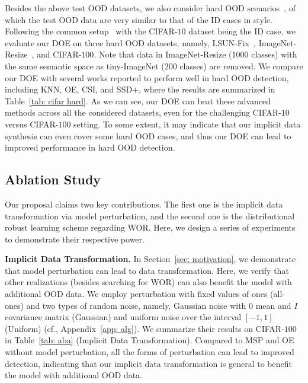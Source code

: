 \documentclass{article} \usepackage{iclr2022_conference,times}
\begin{document}
Besides the above test OOD datasets, we also consider hard OOD scenarios~\citep{Tack20CSI}, of which the test OOD data are very similar to that of the ID cases in style. Following the common setup~\citep{SunM0L22} with the CIFAR-$10$ dataset being the ID case, we evaluate our DOE on three hard OOD datasets, namely, LSUN-Fix~\citep{yu2015lsun}, ImageNet-Resize~\citep{deng2009imagenet}, and CIFAR-$100$. Note that data in ImageNet-Resize ($1000$ classes) with the same semantic space as tiny-ImageNet ($200$ classes) are removed. We compare our DOE with several works reported to perform well in hard OOD detection, including KNN, OE, CSI, and SSD+, where the results are summarized in Table~\ref{tab: cifar hard}. As we can see, our DOE can beat these advanced methods across all the considered datasets, even for the challenging CIFAR-$10$ versus CIFAR-$100$ setting. To some extent, it may indicate that our implicit data synthesis can even cover some hard OOD cases, and thus our DOE can lead to improved performance in hard OOD detection. 




\subsection{Ablation Study} \label{sec: ablation}




Our proposal claims two key contributions. The first one is the implicit data transformation via model perturbation, and the second one is the distributional robust learning scheme regarding WOR. Here, we design a series of experiments to demonstrate their respective power. 

\textbf{Implicit Data Transformation.} 
In Section~\ref{sec: motivation}, we demonstrate that model perturbation can lead to data transformation. Here, we verify that other realizations (besides searching for WOR) can also benefit the model with additional OOD data. We employ perturbation with fixed values of ones (all-ones) and two types of random noise, namely, Gaussian noise with $0$ mean and $I$ covariance matrix (Gaussian) and uniform noise over the interval $[-1,1]$ (Uniform) {(cf., Appendix~\ref{app: alg})}. We summarize their results on CIFAR-$100$ in Table~\ref{tab: aba} (Implicit Data Transformation). Compared to MSP and OE without model perturbation, all the forms of perturbation can lead to improved detection, indicating that our implicit data transformation is general to benefit the model with additional OOD data. 
\end{document}
